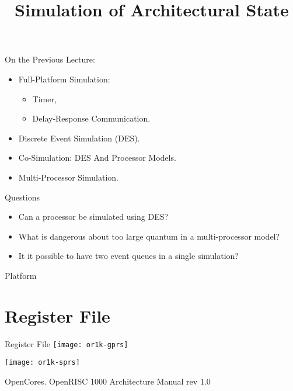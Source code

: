 

\title{Simulation of Architectural State}




\startslides

\begin{frame}{On the Previous Lecture:}
\begin{itemize}
\item Full-Platform Simulation:
  \begin{itemize}
  \item Timer,
  \item Delay-Response Communication.
  \end{itemize}
\item Discrete Event Simulation (DES).
\item Co-Simulation: DES And Processor Models.
\item Multi-Processor Simulation.
\end{itemize}
\end{frame}

\begin{frame}{Questions}
\begin{itemize}
\item Can a processor be simulated using DES?\pause
\item What is dangerous about too large quantum in a multi-processor model?\pause
\item It it possible to have two event queues in a single simulation?
\end{itemize}
\end{frame}

\begin{frame}{Platform}
\centering
\vfill
{}
\vfill
\end{frame}

\section{Register File}

\begin{frame}{Register File}
\centering
\texttt{[image: or1k-gprs]}

\texttt{[image: or1k-sprs]}

\tiny{OpenCores. OpenRISC 1000 Architecture Manual rev 1.0}
\end{frame}


